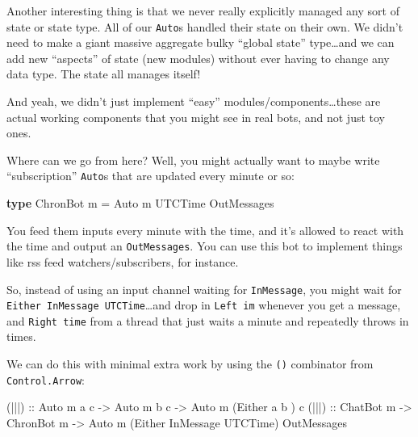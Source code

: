 \documentclass[]{article}
\newenvironment{Shaded}{}{}
\newcommand{\DataTypeTok}[1]{\textcolor[rgb]{0.56,0.13,0.00}{#1}}
\newcommand{\FunctionTok}[1]{\textcolor[rgb]{0.02,0.16,0.49}{#1}}
\newcommand{\KeywordTok}[1]{\textcolor[rgb]{0.00,0.44,0.13}{\textbf{#1}}}
\newcommand{\NormalTok}[1]{#1}
\newcommand{\OtherTok}[1]{\textcolor[rgb]{0.00,0.44,0.13}{#1}}
\begin{document}
Another interesting thing is that we never really explicitly managed any sort of
state or state type. All of our \texttt{Auto}s handled their state on their own.
We didn't need to make a giant massive aggregate bulky ``global state''
type\ldots{}and we can add new ``aspects'' of state (new modules) without ever
having to change any data type. The state all manages itself!

And yeah, we didn't just implement ``easy'' modules/components\ldots{}these are
actual working components that you might see in real bots, and not just toy
ones.

Where can we go from here? Well, you might actually want to maybe write
``subscription'' \texttt{Auto}s that are updated every minute or so:

\begin{Shaded}
\begin{Highlighting}[]
\KeywordTok{type} \DataTypeTok{ChronBot}\NormalTok{ m }\FunctionTok{=} \DataTypeTok{Auto}\NormalTok{ m }\DataTypeTok{UTCTime} \DataTypeTok{OutMessages}
\end{Highlighting}
\end{Shaded}

You feed them inputs every minute with the time, and it's allowed to react with
the time and output an \texttt{OutMessages}. You can use this bot to implement
things like rss feed watchers/subscribers, for instance.

So, instead of using an input channel waiting for \texttt{InMessage}, you might
wait for \texttt{Either\ InMessage\ UTCTime}\ldots{}and drop in
\texttt{Left\ im} whenever you get a message, and \texttt{Right\ time} from a
thread that just waits a minute and repeatedly throws in times.

We can do this with minimal extra work by using the
\texttt{(\textbar{}\textbar{}\textbar{})} combinator from
\texttt{Control.Arrow}:

\begin{Shaded}
\begin{Highlighting}[]
\OtherTok{(|||) ::} \DataTypeTok{Auto}\NormalTok{ m a c }\OtherTok{->} \DataTypeTok{Auto}\NormalTok{ m b c }\OtherTok{->} \DataTypeTok{Auto}\NormalTok{ m (}\DataTypeTok{Either}\NormalTok{ a         b      ) c}
\OtherTok{(|||) ::} \DataTypeTok{ChatBot}\NormalTok{ m  }\OtherTok{->} \DataTypeTok{ChronBot}\NormalTok{ m }\OtherTok{->} \DataTypeTok{Auto}\NormalTok{ m (}\DataTypeTok{Either} \DataTypeTok{InMessage} \DataTypeTok{UTCTime}\NormalTok{) }\DataTypeTok{OutMessages}
\end{Highlighting}
\end{Shaded}
\end{document}
